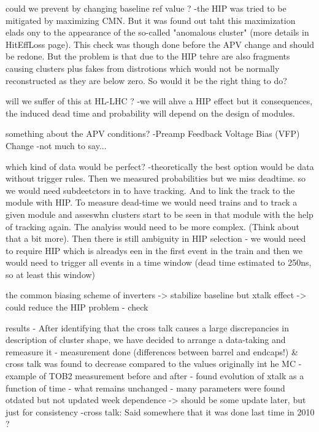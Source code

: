 could we prevent by changing baseline ref value ?
	-the HIP was tried to be mitigated by maximizing CMN. But it was found out taht this maximization elads ony to the appearance of the so-called "anomalous cluster" (more details in HitEffLoss page). This check was though done before the APV change and should be redone. But the problem is that due to the HIP tehre are also fragments causing clusters plus fakes from distrotions which would not be normally reconstructed as they are below zero. So would it be the right thing to do?  %

will we suffer of this at HL-LHC ?
	-we will ahve a HIP effect but it consequences, the induced dead time and probability will depend on the design of modules.

something about the APV conditions?
	-Preamp Feedback Voltage Bias (VFP) Change
	-not much to say...

which kind of data would be perfect?
	-theoretically the best option would be data without trigger rules. Then we measured probabilities but we miss deadtime. so we would need subdeetctors in to have tracking. And to link the track to the module with HIP. To measure dead-time we would need trains and to track a given module and asseswhn clusters start to be seen in that module with the help of tracking again. The analyiss would need to be more complex. (Think about that a bit more). Then there is still ambiguity in HIP selection - we would need to require HIP which is alreadys een in the first event in the train and then we would need to trigger all events in a time window (dead time estimated to 250ns, so at least this window)

the common biasing scheme of inverters -> stabilize baseline but xtalk effect -> could reduce the HIP problem - check 


results
	- After identifying that the cross talk causes a large discrepancies in description of cluster shape, we have decided to arrange a data-taking and remeasure it
	- measurement done (differences between barrel and endcaps!) \& cross talk was found to decrease compared to the values originally int he MC
	- example of TOB2 measurement before and after
	- found evolution of xtalk as a function of time
 	- what remains unchanged - many parameters were found otdated but not updated week dependence -> should be some update later, but just for consistency
	-cross talk: Said somewhere that it was done last time in 2010 ?

